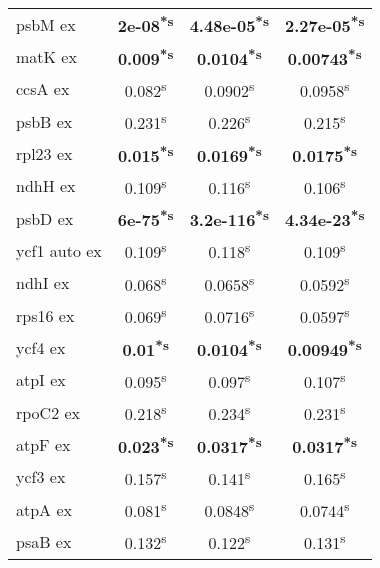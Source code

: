 \documentclass[a4paper]{article}
\begin{document}
\begin{longtable}{l|c|c|c}
psbM ex&\textbf{2e-08\textsuperscript{*}\textsuperscript{s}}&\textbf{4.48e-05\textsuperscript{*}\textsuperscript{s}}&\textbf{2.27e-05\textsuperscript{*}\textsuperscript{s}}\\
matK ex&\textbf{0.009\textsuperscript{*}\textsuperscript{s}}&\textbf{0.0104\textsuperscript{*}\textsuperscript{s}}&\textbf{0.00743\textsuperscript{*}\textsuperscript{s}}\\
ccsA ex&0.082\textsuperscript{s}&0.0902\textsuperscript{s}&0.0958\textsuperscript{s}\\
psbB ex&0.231\textsuperscript{s}&0.226\textsuperscript{s}&0.215\textsuperscript{s}\\
rpl23 ex&\textbf{0.015\textsuperscript{*}\textsuperscript{s}}&\textbf{0.0169\textsuperscript{*}\textsuperscript{s}}&\textbf{0.0175\textsuperscript{*}\textsuperscript{s}}\\
ndhH ex&0.109\textsuperscript{s}&0.116\textsuperscript{s}&0.106\textsuperscript{s}\\
psbD ex&\textbf{6e-75\textsuperscript{*}\textsuperscript{s}}&\textbf{3.2e-116\textsuperscript{*}\textsuperscript{s}}&\textbf{4.34e-23\textsuperscript{*}\textsuperscript{s}}\\
ycf1 auto ex&0.109\textsuperscript{s}&0.118\textsuperscript{s}&0.109\textsuperscript{s}\\
ndhI ex&0.068\textsuperscript{s}&0.0658\textsuperscript{s}&0.0592\textsuperscript{s}\\
rps16 ex&0.069\textsuperscript{s}&0.0716\textsuperscript{s}&0.0597\textsuperscript{s}\\
ycf4 ex&\textbf{0.01\textsuperscript{*}\textsuperscript{s}}&\textbf{0.0104\textsuperscript{*}\textsuperscript{s}}&\textbf{0.00949\textsuperscript{*}\textsuperscript{s}}\\
atpI ex&0.095\textsuperscript{s}&0.097\textsuperscript{s}&0.107\textsuperscript{s}\\
rpoC2 ex&0.218\textsuperscript{s}&0.234\textsuperscript{s}&0.231\textsuperscript{s}\\
atpF ex&\textbf{0.023\textsuperscript{*}\textsuperscript{s}}&\textbf{0.0317\textsuperscript{*}\textsuperscript{s}}&\textbf{0.0317\textsuperscript{*}\textsuperscript{s}}\\
ycf3 ex&0.157\textsuperscript{s}&0.141\textsuperscript{s}&0.165\textsuperscript{s}\\
atpA ex&0.081\textsuperscript{s}&0.0848\textsuperscript{s}&0.0744\textsuperscript{s}\\
psaB ex&0.132\textsuperscript{s}&0.122\textsuperscript{s}&0.131\textsuperscript{s}\\

\end{longtable}
\end{document}
